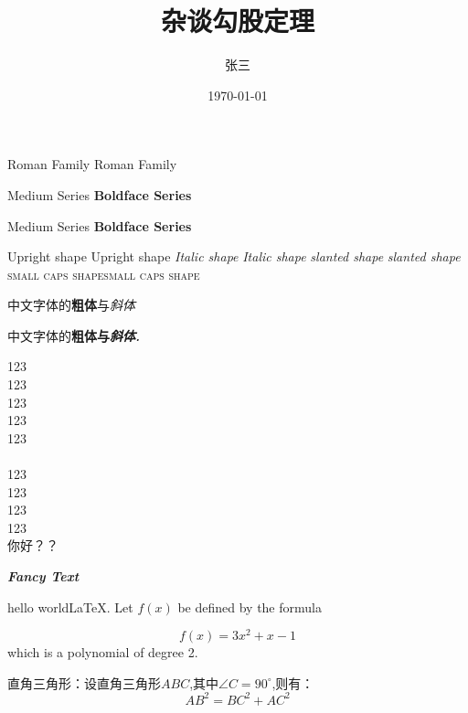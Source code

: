 \documentclass[utf8 10pt]{article}  %
\title{\heiti 杂谈勾股定理}
\author{\kaishu 张三}
\date{\today}
\newcommand\degree{^\circ}
\newcommand{\myfont}{\textit{\textbf{\textsf{Fancy Text}}}}
\begin{document}
    \textrm{Roman Family}
    \rmfamily Roman Family
    \textsf{}
    \sffamily
    \texttt{}
    \ttfamily

    \textmd{Medium Series}
    \textbf{Boldface Series}

    {\mdseries Medium Series}
    {\bfseries Boldface Series}

    \textup{Upright shape}   {\upshape Upright shape}
    \textit{Italic shape}    {\itshape Italic shape}
    \textsl{slanted shape}   {\slshape slanted shape}
    \textsc{small caps shape}{\scshape small caps shape}


    {\songti}
    {\heiti}
    {\kaishu}
    {\fangsong}

    中文字体的\textbf{粗体}与\textit{斜体}

    中文字体的\bf{粗体}与\it{斜体}.

    \sffamily
    {\tiny 123}\\
    {\scriptsize 123}\\
    {\footnotesize 123}\\
    {\small 123}\\
    {\normalsize 123}\\
    {}\\
    {\Large 123}\\
    {\LARGE 123}\\
    {\huge 123}\\
    {\Huge 123}\\

     你好？？

    \myfont



    \maketitle
    hello world\LaTeX.
    Let $f(x)$ be defined by the formula

    $$f(x)=3x^2+x-1$$ which is a polynomial of degree 2.


    直角三角形：设直角三角形$ABC$,其中$\angle C=90\degree$,则有：
    \begin{equation}
        AB^2=BC^2+AC^2\label{eq:equation}
    \end{equation}
\end{document}
